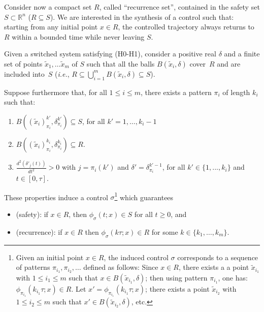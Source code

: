 Consider now a compact set $R$, called ``recurrence set'', contained
in the safety set $S\subset\mathbb{R}^n$ ($R\subseteq S$). We are
interested in the synthesis of a control such that: starting from any
initial point $x\in R$, the controlled trajectory always returns to
$R$ within a bounded time while never leaving $S$.

\begin{corollary}
  \label{cor:cont}
  Given a switched system satisfying (H0-H1), consider a positive real
  $\delta$ and a finite set of points $\tilde{x}_1,\dots\tilde{x}_m$
  of $S$ such that all the balls $B(\tilde{x}_i,\delta)$ cover~$R$ and
  are included into~$S$ (\textit{i.e.}, $R\subseteq
  \bigcup_{i=1}^mB(\tilde{x}_i,\delta)\subseteq S$).

  Suppose furthermore that, for all $1\leq i\leq m$, there exists a
  pattern $\pi_i$ of length $k_i$ such that:
  \begin{enumerate}
  \item $B((\tilde{x}_i)_{\pi_i}^{k'},\delta_{\pi_i}^{k'}) \subseteq
    S$, for all $k'=1,\dots,k_i-1$
%
\item
  $B((\tilde{x}_i)_{\pi_i}^{k_i}, \delta_{\pi_i}^{k_i}) \subseteq R.$
%
\item $\frac{d^2(\delta'_j(t))}{dt^2}>0$ with $j=\pi_i(k')$ and
  $\delta'=\delta_{\pi_i}^{k'-1}$, for all $k'\in\{1,...,k_i\}$ and
  $t\in [0,\tau]$.
\end{enumerate}
These properties induce a control $\sigma$\footnote{Given an initial
  point $x\in R$, the induced control $\sigma$ corresponds to a
  sequence of patterns $\pi_{i_1},\pi_{i_2},\dots$ defined as follows:
  Since $x\in R$, there exists a a point $\tilde{x}_{i_1}$ with $1\leq
  i_1\leq m$ such that $x\in B(\tilde{x}_{i_1},\delta)$; then using
  pattern $\pi_{i_1}$, one has: $\phi_{\pi_{i_1}}(k_{i_1}\tau;x)\in
  R$. Let $x'=\phi_{\pi_{i_1}}(k_{i_1}\tau;x)$; there exists a point
  $\tilde{x}_{i_2}$ with $1\leq i_2\leq m$ such that $x'\in
  B(\tilde{x}_{i_2},\delta)$, etc.}
%
which guarantees
\begin{itemize}
\item (safety): if $x\in R$, then $\phi_{\sigma}(t;x) \in S$ for all
  $t\geq 0$, and
\item (recurrence): if $x\in R$ then $\phi_{\sigma}(k\tau;x)\in R$ for
  some $k\in\{k_1,\dots,k_m\}$.
\end{itemize}
%
\label{prop:ter1_part4}
\end{corollary}

